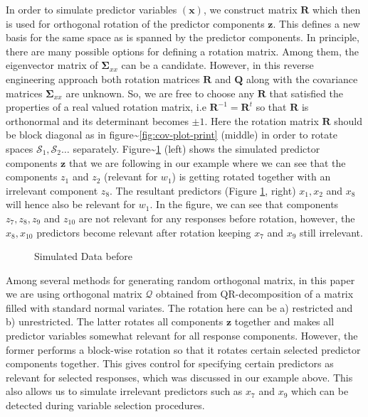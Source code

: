 \documentclass[num-refs]{wiley-article}
\begin{document}
In order to simulate predictor variables \((\mathbf{x})\), we construct
matrix \(\mathbf{R}\) which then is used for orthogonal rotation of the
predictor components \(\mathbf{z}\). This defines a new basis for the
same space as is spanned by the predictor components. In principle,
there are many possible options for defining a rotation matrix. Among
them, the eigenvector matrix of \(\boldsymbol{\Sigma}_{xx}\) can be a
candidate. However, in this reverse engineering approach both rotation
matrices \(\mathbf{R}\) and \(\mathbf{Q}\) along with the covariance
matrices \(\boldsymbol{\Sigma}_{xx}\) are unknown. So, we are free to
choose any \(\mathbf{R}\) that satisfied the properties of a real valued
rotation matrix, i.e \(\mathbf{R}^{-1} = \mathbf{R}^t\) so that
\(\mathbf{R}\) is orthonormal and its determinant becomes \(\pm 1\).
Here the rotation matrix \(\mathbf{R}\) should be block diagonal as in
figure\textasciitilde{}\ref{fig:cov-plot-print} (middle) in order to
rotate spaces \(\mathcal{S}_1, \mathcal{S}_2 \ldots\) separately.
Figure\textasciitilde{}\ref{fig:simulated-data} (left) shows the
simulated predictor components \(\mathbf{z}\) that we are following in
our example where we can see that the components \(z_{1}\) and \(z_{2}\)
(relevant for \(w_1\)) is getting rotated together with an irrelevant
component \(z_{8}\). The resultant predictors (Figure
\ref{fig:simulated-data}, right) \(x_{1}, x_{2}\) and \(x_{8}\) will
hence also be relevant for \(w_1\). In the figure, we can see that
components \(z_{7}, z_{8}, z_{9}\) and \(z_{10}\) are not relevant for
any responses before rotation, however, the \(x_{8}, x_{10}\) predictors
become relevant after rotation keeping \(x_{7}\) and \(x_{9}\) still
irrelevant.

\begin{figure}

{\centering {}

}

\caption{Simulated Data before}\label{fig:simulated-data}
\end{figure}

Among several methods
\citep{anderson1987generation, heiberger1978algorithm} for generating
random orthogonal matrix, in this paper we are using orthogonal matrix
\(\mathcal{Q}\) obtained from QR-decomposition of a matrix filled with
standard normal variates. The rotation here can be a) restricted and b)
unrestricted. The latter rotates all components \(\mathbf{z}\) together
and makes all predictor variables somewhat relevant for all response
components. However, the former performs a block-wise rotation so that
it rotates certain selected predictor components together. This gives
control for specifying certain predictors as relevant for selected
responses, which was discussed in our example above. This also allows us
to simulate irrelevant predictors such as \(x_{7}\) and \(x_{9}\) which
can be detected during variable selection procedures.
\end{document}
